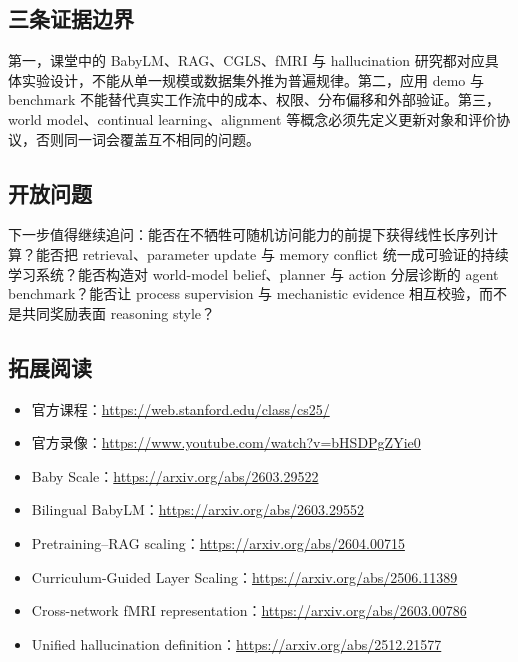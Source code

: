 \subsection{三条证据边界}

第一，课堂中的 BabyLM、RAG、CGLS、fMRI 与 hallucination 研究都对应具体实验设计，不能从单一规模或数据集外推为普遍规律。第二，应用 demo 与 benchmark 不能替代真实工作流中的成本、权限、分布偏移和外部验证。第三，world model、continual learning、alignment 等概念必须先定义更新对象和评价协议，否则同一词会覆盖互不相同的问题。

\subsection{开放问题}

下一步值得继续追问：能否在不牺牲可随机访问能力的前提下获得线性长序列计算？能否把 retrieval、parameter update 与 memory conflict 统一成可验证的持续学习系统？能否构造对 world-model belief、planner 与 action 分层诊断的 agent benchmark？能否让 process supervision 与 mechanistic evidence 相互校验，而不是共同奖励表面 reasoning style？

\subsection{拓展阅读}

\begin{itemize}
  \item 官方课程：\url{https://web.stanford.edu/class/cs25/}
  \item 官方录像：\url{https://www.youtube.com/watch?v=bHSDPgZYie0}
  \item Baby Scale：\url{https://arxiv.org/abs/2603.29522}
  \item Bilingual BabyLM：\url{https://arxiv.org/abs/2603.29552}
  \item Pretraining--RAG scaling：\url{https://arxiv.org/abs/2604.00715}
  \item Curriculum-Guided Layer Scaling：\url{https://arxiv.org/abs/2506.11389}
  \item Cross-network fMRI representation：\url{https://arxiv.org/abs/2603.00786}
  \item Unified hallucination definition：\url{https://arxiv.org/abs/2512.21577}
\end{itemize}


